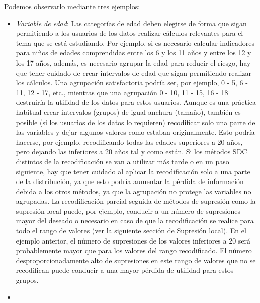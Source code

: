 \documentclass[
]{book}
\theoremstyle{definition}
\theoremstyle{definition}
\theoremstyle{definition}
\theoremstyle{definition}
\theoremstyle{remark}
\begin{document}
Podemos observarlo mediante tres ejemplos:

\begin{itemize}
\item
  \emph{Variable de edad}: Las categorías de edad deben elegirse de forma que sigan permitiendo a los usuarios de los datos realizar cálculos relevantes para el tema que se está estudiando. Por ejemplo, si es necesario calcular indicadores para niños de edades comprendidas entre los 6 y los 11 años y entre los 12 y los 17 años, además, es necesario agrupar la edad para reducir el riesgo, hay que tener cuidado de crear intervalos de edad que sigan permitiendo realizar los cálculos. Una agrupación satisfactoria podría ser, por ejemplo, 0 - 5, 6 - 11, 12 - 17, etc., mientras que una agrupación 0 - 10, 11 - 15, 16 - 18 destruiría la utilidad de los datos para estos usuarios. Aunque es una práctica habitual crear intervalos (grupos) de igual anchura (tamaño), también es posible (si los usuarios de los datos lo requieren) recodificar solo una parte de las variables y dejar algunos valores como estaban originalmente. Esto podría hacerse, por ejemplo, recodificando todas las edades superiores a 20 años, pero dejando las inferiores a 20 años tal y como están. Si los métodos SDC distintos de la recodificación se van a utilizar más tarde o en un paso siguiente, hay que tener cuidado al aplicar la recodificación solo a una parte de la distribución, ya que esto podría aumentar la pérdida de información debida a los otros métodos, ya que la agrupación no protege las variables no agrupadas. La recodificación parcial seguida de métodos de supresión como la supresión local puede, por ejemplo, conducir a un número de supresiones mayor del deseado o necesario en caso de que la recodificación se realice para todo el rango de valores (ver la siguiente sección de \protect\hyperlink{sup-loc}{Supresión local}). En el ejemplo anterior, el número de supresiones de los valores inferiores a 20 será probablemente mayor que para los valores del rango recodificado. El número desproporcionadamente alto de supresiones en este rango de valores que no se recodifican puede conducir a una mayor pérdida de utilidad para estos grupos.
\item

\end{itemize}
\end{document}
